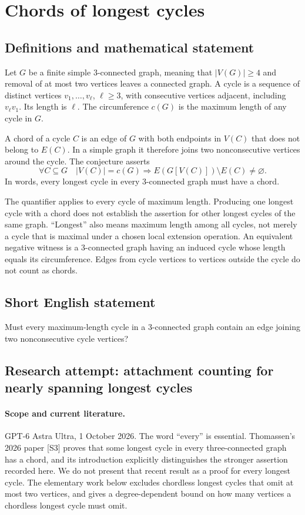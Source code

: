 \documentclass[11pt,a4paper]{article}
\begin{document}
\section*{Chords of longest cycles}\label{statement}

\subsection{Definitions and mathematical statement}
Let $G$ be a finite simple $3$-connected graph, meaning that
$|V(G)|\geq4$ and removal of at most two vertices leaves a
connected graph. A cycle is a sequence of distinct vertices
$v_1,\ldots,v_\ell$, $\ell\geq3$, with consecutive vertices
adjacent, including $v_\ell v_1$. Its length is $\ell$.
The circumference $c(G)$ is the maximum length of any cycle
in $G$.

A chord of a cycle $C$ is an edge of $G$ with both endpoints
in $V(C)$ that does not belong to $E(C)$. In a simple graph
it therefore joins two nonconsecutive vertices around the
cycle. The conjecture asserts
\[
 \forall C\subseteq G\quad
 |V(C)|=c(G)\Longrightarrow
 E(G[V(C)])\setminus E(C)\neq\varnothing.
\]
In words, every longest cycle in every $3$-connected graph
must have a chord.

The quantifier applies to every cycle of maximum length.
Producing one longest cycle with a chord does not establish
the assertion for other longest cycles of the same graph.
``Longest'' also means maximum length among all cycles,
not merely a cycle that is maximal under a chosen local
extension operation. An equivalent negative witness is a
$3$-connected graph having an induced cycle whose length
equals its circumference. Edges from cycle vertices to
vertices outside the cycle do not count as chords.
\subsection{Short English statement}
Must every maximum-length cycle in a 3-connected graph contain an edge joining two nonconsecutive cycle vertices?
\subsection{Research attempt: attachment counting for nearly spanning longest cycles}
\paragraph{Scope and current literature.}
GPT-6 Astra Ultra, 1 October 2026. The word ``every'' is essential.
Thomassen's 2026 paper [S3] proves that some longest cycle in every
three-connected graph has a chord, and its introduction explicitly
distinguishes the stronger assertion recorded here. We do not present
that recent result as a proof for every longest cycle. The elementary
work below excludes chordless longest cycles that omit at most two
vertices, and gives a degree-dependent bound on how many vertices a
chordless longest cycle must omit.
\end{document}
